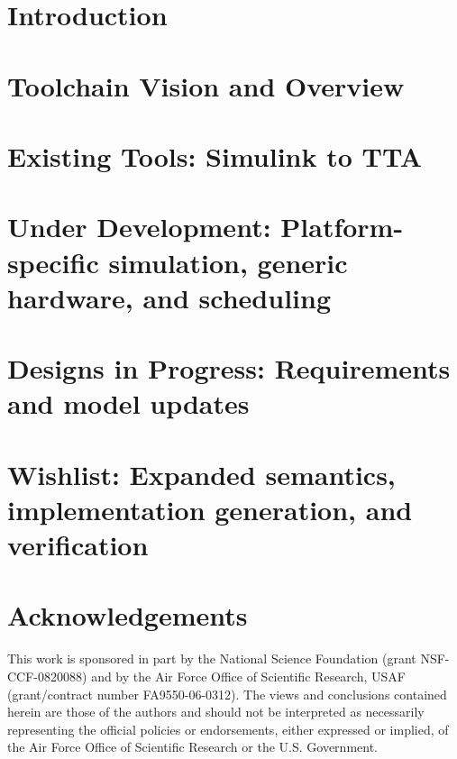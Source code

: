 \documentclass{llncs}
\begin{document}
\section{Introduction}


\section{Toolchain Vision and Overview}

%

\section{Existing Tools: Simulink to TTA}

%
%

\section{Under Development: Platform-specific simulation, generic hardware, and scheduling}

%
%

\section{Designs in Progress: Requirements and model updates}

%
%

\section{Wishlist: Expanded semantics, implementation generation, and verification}

%

\section{Acknowledgements}
This work is sponsored in part by the National Science Foundation (grant NSF-CCF-0820088) and by the Air Force Office of Scientific Research, USAF (grant/contract number FA9550-06-0312).  The views and conclusions contained herein are those of the authors and should not be interpreted as necessarily representing the official policies or endorsements, either expressed or implied, of the Air Force Office of Scientific Research or the U.S. Government.


%



\end{document}
